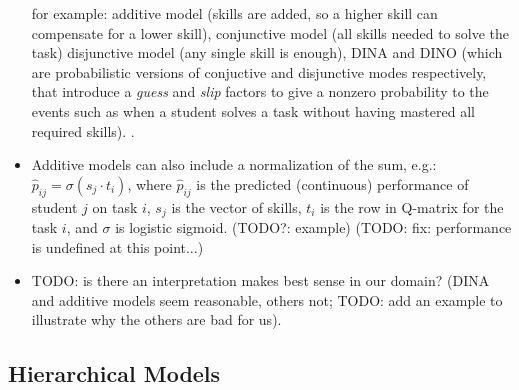 \begin{itemize}
  for example:
    additive model (skills are added, so a higher skill can compensate for a lower skill),
    conjunctive model (all skills needed to solve the task)
    disjunctive model (any single skill is enough),
    DINA and DINO (which are probabilistic versions of conjuctive and disjunctive modes
    respectively, that introduce a \emph{guess} and \emph{slip} factors to give a nonzero
    probability to the events such as when a student solves a task without
    having mastered all required skills).
    \cite[chapter 3]{its-domain-models}.
\item Additive models can also include a normalization of the sum, e.g.:
  $\hat{p}_{ij} = \sigma(s_j \cdot t_i)$, where
  $\hat{p}_{ij}$ is the predicted (continuous) performance of student $j$ on task $i$,
  $s_j$ is the vector of skills, $t_i$ is the row in Q-matrix for the task $i$,
  and $\sigma$ is logistic sigmoid. (TODO?: example)
  (TODO: fix: performance is undefined at this point...)
\item TODO: is there an interpretation makes best sense in our domain?
  (DINA and additive models seem reasonable, others not;
  TODO: add an example to illustrate why the others are bad for us).
\end{itemize}



\subsection{Hierarchical Models}

